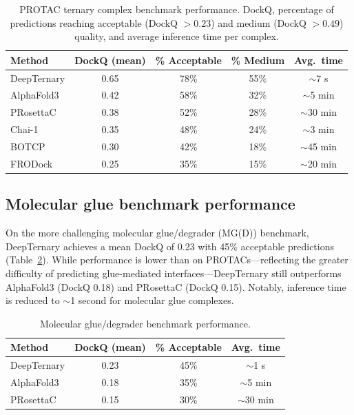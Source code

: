 \documentclass[11pt]{article}
\begin{document}
\begin{table}[htbp]
\centering
\caption{PROTAC ternary complex benchmark performance. DockQ, percentage of predictions reaching acceptable (DockQ $> 0.23$) and medium (DockQ $> 0.49$) quality, and average inference time per complex.}
\label{tab:protac}
\begin{tabular}{@{}lcccc@{}}
\toprule
Method & DockQ (mean) & \% Acceptable & \% Medium & Avg.\ time \\
\midrule
DeepTernary & 0.65 & 78\% & 55\% & $\sim$7 s \\
AlphaFold3  & 0.42 & 58\% & 32\% & $\sim$5 min \\
PRosettaC   & 0.38 & 52\% & 28\% & $\sim$30 min \\
Chai-1      & 0.35 & 48\% & 24\% & $\sim$3 min \\
BOTCP       & 0.30 & 42\% & 18\% & $\sim$45 min \\
FRODock     & 0.25 & 35\% & 15\% & $\sim$20 min \\
\bottomrule
\end{tabular}
\end{table}

\subsection{Molecular glue benchmark performance}

On the more challenging molecular glue/degrader (MG(D)) benchmark, DeepTernary achieves a mean DockQ of 0.23 with 45\% acceptable predictions (Table~\ref{tab:mg}). While performance is lower than on PROTACs---reflecting the greater difficulty of predicting glue-mediated interfaces---DeepTernary still outperforms AlphaFold3 (DockQ 0.18) and PRosettaC (DockQ 0.15). Notably, inference time is reduced to $\sim$1 second for molecular glue complexes.

\begin{table}[htbp]
\centering
\caption{Molecular glue/degrader benchmark performance.}
\label{tab:mg}
\begin{tabular}{@{}lccc@{}}
\toprule
Method & DockQ (mean) & \% Acceptable & Avg.\ time \\
\midrule
DeepTernary & 0.23 & 45\% & $\sim$1 s \\
AlphaFold3  & 0.18 & 35\% & $\sim$5 min \\
PRosettaC   & 0.15 & 30\% & $\sim$30 min \\
\bottomrule
\end{tabular}
\end{table}
\end{document}
